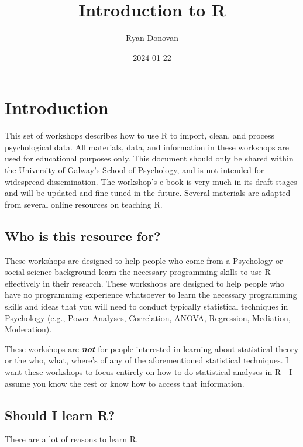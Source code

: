 \documentclass[
]{book}
\title{Introduction to R}
\author{Ryan Donovan}
\date{2024-01-22}
\begin{document}
\maketitle

{
\setcounter{tocdepth}{1}
\tableofcontents
}
\hypertarget{introduction}{%
\chapter{Introduction}\label{introduction}}

This set of workshops describes how to use R to import, clean, and process psychological data. All materials, data, and information in these workshops are used for educational purposes only. This document should only be shared within the University of Galway's School of Psychology, and is not intended for widespread dissemination. The workshop's e-book is very much in its draft stages and will be updated and fine-tuned in the future. Several materials are adapted from several online resources on teaching R.

\hypertarget{who-is-this-resource-for}{%
\section{Who is this resource for?}\label{who-is-this-resource-for}}

These workshops are designed to help people who come from a Psychology or social science background learn the necessary programming skills to use R effectively in their research. These workshops are designed to help people who have no programming experience whatsoever to learn the necessary programming skills and ideas that you will need to conduct typically statistical techniques in Psychology (e.g., Power Analyses, Correlation, ANOVA, Regression, Mediation, Moderation).

These workshops are \textbf{\emph{not}} for people interested in learning about statistical theory or the who, what, where's of any of the aforementioned statistical techniques. I want these workshops to focus entirely on how to do statistical analyses in R - I assume you know the rest or know how to access that information.

\hypertarget{should-i-learn-r}{%
\section{Should I learn R?}\label{should-i-learn-r}}

There are a lot of reasons to learn R.
\end{document}
